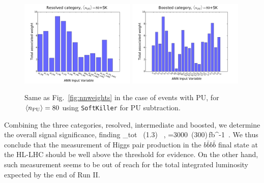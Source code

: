 \begin{figure}[t]
\begin{center}
\includegraphics[width=0.49\textwidth]{plots/res_wgthist_SKPU80.pdf}
\includegraphics[width=0.49\textwidth]{plots/bst_wgthist_SKPU80.pdf}
\vspace{-0.5cm}
\caption{\small
Same as Fig.~\ref{fig:nnweights} in the
case of events with PU, for
$\left\langle n_{\rm PU}\right\rangle=80$
using
{\tt SoftKiller} for PU subtraction.
}
\label{fig:nnweights_PU}
\end{center}
\end{figure}


Combining the three categories, resolved,
intermediate and boosted, we determine the overall signal
significance, finding
\be
\lp {}\rp_{\rm tot} ~(1.3) \, ,\quad
{}=3000~(300)\,{\rm fb}^{-1}\, .
\ee
%
We thus conclude that the measurement of
Higgs pair production in the $b\bar{b}b\bar{b}$ final state at the HL-LHC
should be 
well above the threshold for evidence.
%
On the other hand, such measurement seems to be out of reach
for the total integrated luminosity expected by the end of Run II.

